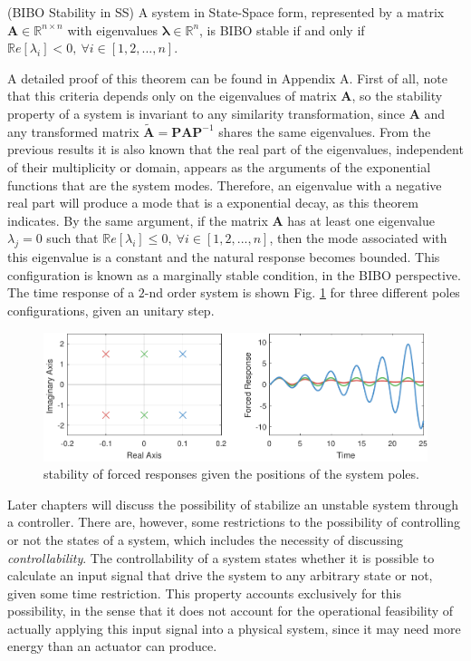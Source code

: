 \documentclass[a4paper,11pt]{book}
\numberwithin{figure}{chapter}
\numberwithin{equation}{chapter}
\numberwithin{table}{chapter}
\newtheorem{theorem}{Theorem}[chapter]
\theoremstyle{definition}
\newcounter{boxed-theorem}
\newenvironment{boxed-theorem}[1]
{\begin{shaded} \begin{theorem}{#1}}
{\end{theorem} \end{shaded}}
\newcounter{boxed-definition}
\begin{document}
\begin{boxed-theorem}{(BIBO Stability in SS)}
	A system in State-Space form, represented by a matrix $\bm{A} \in \mathbb{R}^{n \times n}$ with eigenvalues $\bm{\lambda} \in \mathbb{R}^n$, is BIBO stable if and only if $\mathbb{R}e[\lambda_i] < 0,\ \forall i \in [1,2,...,n]$.
\end{boxed-theorem}

A detailed proof of this theorem can be found in Appendix A. First of all, note that this criteria depends only on the eigenvalues of matrix $\bm{A}$, so the stability property of a system is invariant to any similarity transformation, since $\bm{A}$ and any transformed matrix $\tilde{\bm{A}} = \bm{P} \bm{A} \bm{P}^{-1}$ shares the same eigenvalues. From the previous results it is also known that the real part of the eigenvalues, independent of their multiplicity or domain, appears as the arguments of the exponential functions that are the system modes. Therefore, an eigenvalue with a negative real part will produce a mode that is a exponential decay, as this theorem indicates. By the same argument, if the matrix $\bm{A}$ has at least one eigenvalue $\lambda_j = 0$ such that $\mathbb{R}e[\lambda_i] \leq 0,\ \forall i \in [1,2,...,n]$, then the mode associated with this eigenvalue is a constant and the natural response becomes bounded. This configuration is known as a marginally stable condition, in the BIBO perspective. The time response of a $2$-nd order system is shown Fig. \ref{fig:stability01} for three different poles configurations, given an unitary step.

\begin{figure}[ht]
    \centering
    \includegraphics[width=\textwidth]{chapter2/stability01}
    \caption{stability of forced responses given the positions of the system poles.}
    \label{fig:stability01}
\end{figure} 

Later chapters will discuss the possibility of stabilize an unstable system through a controller. There are, however, some restrictions to the possibility of controlling or not the states of a system, which includes the necessity of discussing \textit{controllability}. The controllability of a system states whether it is possible to calculate an input signal that drive the system to any arbitrary state or not, given some time restriction. This property accounts exclusively for this possibility, in the sense that it does not account for the operational feasibility of actually applying this input signal into a physical system, since it may need more energy than an actuator can produce. 
\end{document}
